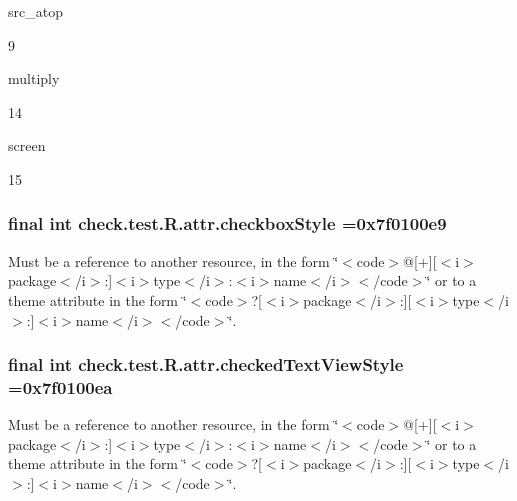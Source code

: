{\ttfamily src\+\_\+atop}

9

{\ttfamily multiply}

14

{\ttfamily screen}

15\hypertarget{classcheck_1_1test_1_1_r_1_1attr_ac810a4b97f13c32171e9d45d5921e8a6}{}
\subsubsection[{checkbox\+Style}]{\setlength{\rightskip}{0pt plus 5cm}final int check.\+test.\+R.\+attr.\+checkbox\+Style =0x7f0100e9\hspace{0.3cm}{\ttfamily [static]}}\label{classcheck_1_1test_1_1_r_1_1attr_ac810a4b97f13c32171e9d45d5921e8a6}
Must be a reference to another resource, in the form \char`\"{}$<$code$>$@\mbox{[}+\mbox{]}\mbox{[}$<$i$>$package$<$/i$>$\+:\mbox{]}$<$i$>$type$<$/i$>$\+:$<$i$>$name$<$/i$>$$<$/code$>$\char`\"{} or to a theme attribute in the form \char`\"{}$<$code$>$?\mbox{[}$<$i$>$package$<$/i$>$\+:\mbox{]}\mbox{[}$<$i$>$type$<$/i$>$\+:\mbox{]}$<$i$>$name$<$/i$>$$<$/code$>$\char`\"{}. \hypertarget{classcheck_1_1test_1_1_r_1_1attr_a7a88a225f47722cfdec2c251480bbaef}{}
\subsubsection[{checked\+Text\+View\+Style}]{\setlength{\rightskip}{0pt plus 5cm}final int check.\+test.\+R.\+attr.\+checked\+Text\+View\+Style =0x7f0100ea\hspace{0.3cm}{\ttfamily [static]}}\label{classcheck_1_1test_1_1_r_1_1attr_a7a88a225f47722cfdec2c251480bbaef}
Must be a reference to another resource, in the form \char`\"{}$<$code$>$@\mbox{[}+\mbox{]}\mbox{[}$<$i$>$package$<$/i$>$\+:\mbox{]}$<$i$>$type$<$/i$>$\+:$<$i$>$name$<$/i$>$$<$/code$>$\char`\"{} or to a theme attribute in the form \char`\"{}$<$code$>$?\mbox{[}$<$i$>$package$<$/i$>$\+:\mbox{]}\mbox{[}$<$i$>$type$<$/i$>$\+:\mbox{]}$<$i$>$name$<$/i$>$$<$/code$>$\char`\"{}. \hypertarget{classcheck_1_1test_1_1_r_1_1attr_a097e97b7282f3297ba754bfa32c9f891}{}
